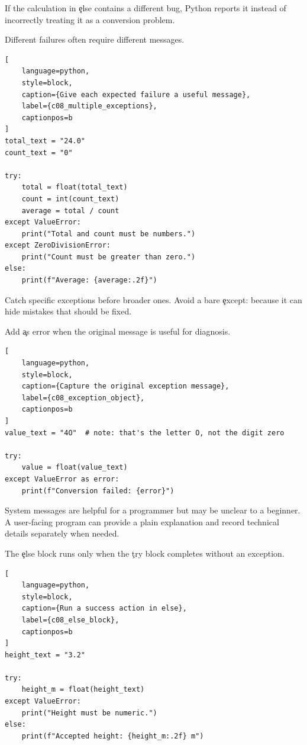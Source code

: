 If the calculation in \c{else} contains a different bug, Python reports it
instead of incorrectly treating it as a conversion problem.


Different failures often require different messages.

\begin{lstlisting}[
    language=python,
    style=block,
    caption={Give each expected failure a useful message},
    label={c08_multiple_exceptions},
    captionpos=b
]
total_text = "24.0"
count_text = "0"

try:
    total = float(total_text)
    count = int(count_text)
    average = total / count
except ValueError:
    print("Total and count must be numbers.")
except ZeroDivisionError:
    print("Count must be greater than zero.")
else:
    print(f"Average: {average:.2f}")
\end{lstlisting}

Catch specific exceptions before broader ones. Avoid a bare \c{except:}
because it can hide mistakes that should be fixed.


Add \c{as error} when the original message is useful for diagnosis.

\begin{lstlisting}[
    language=python,
    style=block,
    caption={Capture the original exception message},
    label={c08_exception_object},
    captionpos=b
]
value_text = "4O"  # note: that's the letter O, not the digit zero

try:
    value = float(value_text)
except ValueError as error:
    print(f"Conversion failed: {error}")
\end{lstlisting}

System messages are helpful for a programmer but may be unclear to a beginner.
A user-facing program can provide a plain explanation and record technical
details separately when needed.


The \c{else} block runs only when the \c{try} block completes without an
exception.

\begin{lstlisting}[
    language=python,
    style=block,
    caption={Run a success action in else},
    label={c08_else_block},
    captionpos=b
]
height_text = "3.2"

try:
    height_m = float(height_text)
except ValueError:
    print("Height must be numeric.")
else:
    print(f"Accepted height: {height_m:.2f} m")
\end{lstlisting}

